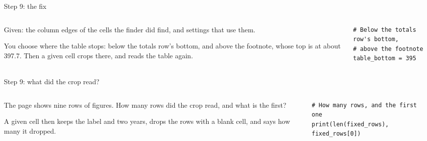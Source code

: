 \documentclass[9pt,aspectratio=169]{beamer}
\begin{document}
\begin{frame}[fragile]{Step 9: the fix}
    \begin{columns}[T]
        \begin{column}{0.37\textwidth}
            Given: the column edges of the cells the finder did find, and settings that use them.

            \medskip
            You choose where the table stops: below the totals row's bottom, and above the footnote, whose top is at about 397.7. Then a given cell crops there, and reads the table again.
        \end{column}
        \begin{column}{0.6\textwidth}
\begin{lstlisting}
# Below the totals row's bottom,
# above the footnote
table_bottom = 395
\end{lstlisting}
        \end{column}
    \end{columns}
\end{frame}

\begin{frame}[fragile]{Step 9: what did the crop read?}
    \begin{columns}[T]
        \begin{column}{0.37\textwidth}
            The page shows nine rows of figures. How many rows did the crop read, and what is the first?

            \medskip
            A given cell then keeps the label and two years, drops the rows with a blank cell, and says how many it dropped.
        \end{column}
        \begin{column}{0.6\textwidth}
\begin{lstlisting}
# How many rows, and the first one
print(len(fixed_rows), fixed_rows[0])
\end{lstlisting}
        \end{column}
    \end{columns}
\end{frame}
\end{document}
